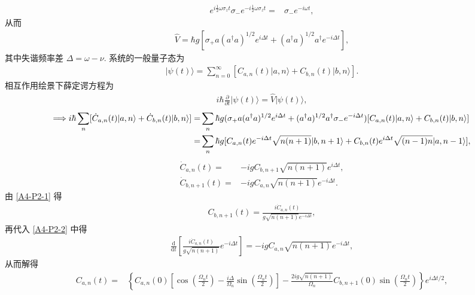 \documentclass{assignment}
\begin{document}
\begin{sol}
\begin{align}
        e^{i\frac{1}{2}\omega\sigma_zt}\sigma_-e^{-i\frac{1}{2}\omega\sigma_zt}=&\sigma_-e^{-i\omega t},
    \end{align}
    从而
    \begin{align}
        \hat{V}=\hbar g\left[\sigma_+a(a^{\dagger}a)^{1/2}e^{i\Delta t}+(a^{\dagger}a)^{1/2}a^{\dagger}e^{-i\Delta t}\right],
    \end{align}
    其中失谐频率差 $\Delta=\omega-\nu$.
    系统的一般量子态为
    \begin{align}
        \lvert\psi(t)\rangle=\sum_{n=0}^{\infty}[C_{a,n}(t)\lvert a,n\rangle+C_{b,n}(t)\lvert b,n\rangle].
    \end{align}
    相互作用绘景下薛定谔方程为
    \begin{align}
        i\hbar\frac{\partial}{\partial t}\lvert\psi(t)\rangle=\hat{V}\lvert\psi(t)\rangle,
    \end{align}
    \begin{align}
        \notag\Longrightarrow i\hbar\sum_n[\dot{C}_{a,n}(t)\lvert a,n\rangle+\dot{C}_{b,n}(t)\lvert b,n\rangle]=&\sum_n\hbar g(\sigma_+a(a^{\dagger}a)^{1/2}e^{i\Delta t}+(a^{\dagger}a)^{1/2}a^{\dagger}\sigma_-e^{-i\Delta t})[C_{a,n}(t)\lvert a,n\rangle+C_{b,n}(t)\lvert b,n\rangle]\\
        =&\sum_n\hbar g[C_{a,n}(t)e^{-i\Delta t}\sqrt{n(n+1)}\lvert b,n+1\rangle+C_{b,n}(t)e^{i\Delta t}\sqrt{(n-1)n}\lvert a,n-1\rangle],
    \end{align}
    \begin{align}
        \label{A4-P2-1}
        \dot{C}_{a,n}(t)=&-igC_{b,n+1}\sqrt{n(n+1)}e^{i\Delta t},\\
        \label{A4-P2-2}
        \dot{C}_{b,n+1}(t)=&-igC_{a,n}\sqrt{n(n+1)}e^{-i\Delta t}.
    \end{align}
    由 \eqref{A4-P2-1} 得
    \begin{align}
        C_{b,n+1}(t)=\frac{i\dot{C}_{a,n}(t)}{g\sqrt{n(n+1)}e^{-i\Delta t}},
    \end{align}
    再代入 \eqref{A4-P2-2} 中得
    \begin{align}
        \frac{\mathrm{d}}{\mathrm{d}t}\left[\frac{i\dot{C}_{a,n}(t)}{g\sqrt{n(n+1)}}e^{-i\Delta t}\right]=-igC_{a,n}\sqrt{n(n+1)}e^{-i\Delta t},
    \end{align}
    从而解得
    \begin{align}
        C_{a,n}(t)=&\left\{C_{a,n}(0)\left[\cos\left(\frac{\Omega_nt}{2}\right)-\frac{i\Delta}{\Omega_n}\sin\left(\frac{\Omega_nt}{2}\right)\right]-\frac{2ig\sqrt{n(n+1)}}{\Omega_n}C_{b,n+1}(0)\sin\left(\frac{\Omega_nt}{2}\right)\right\}e^{i\Delta t/2},\\

\end{align}
\end{sol}
\end{document}
